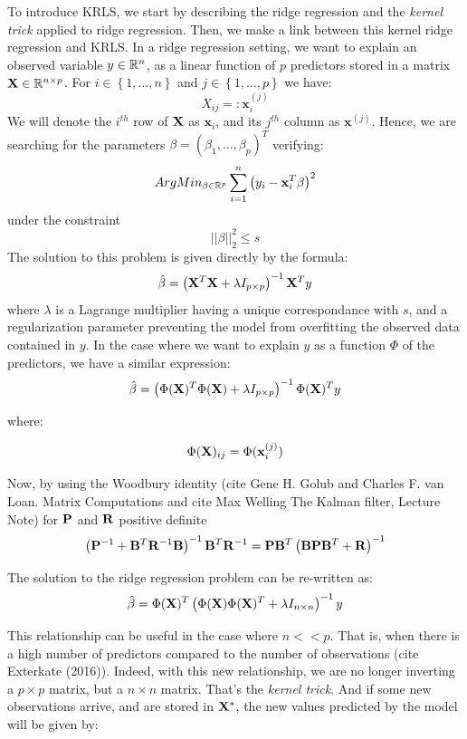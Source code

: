 \medskip

To introduce KRLS, we start by describing the ridge regression \cite{hoerl1970ridge} and the {\it kernel trick} applied to ridge regression. Then, we make a link between this kernel ridge regression and KRLS. In a ridge regression setting, we want to explain an observed variable $y \in \mathbb{R}^n$, as a linear function of $p$ predictors stored in a matrix ${\bf X} \in \mathbb{R}^{n \times p}$. For $i \in \left \lbrace 1, \ldots, n \right \rbrace $ and $j \in \left \lbrace1, \ldots, p \right \rbrace$ we have:
$$
X_{ij} =: \textbf{x}_i^{(j)}
$$
We will denote the $i^{th}$ row of ${\bf X}$ as $\textbf{x}_i$, and its $j^{th}$ column as $\textbf{x}^{(j)}$. Hence, we are searching for the parameters $\beta = \left(\beta_1, \ldots, \beta_p \right)^T$ verifying:
$$
ArgMin_{\beta \in \mathbb{R}^p} \sum_{i = 1}^n \left( y_i - \textbf{x}_i^T {\bf \beta} \right)^2
$$
under the constraint
$$
||\beta ||^2_2 \leq s
$$
The solution to this problem is given directly by the formula:
$$
\hat{\beta} = \left( {\bf X}^T {\bf X} + \lambda I_{p \times p} \right)^{-1}{\bf X}^T y
$$
where $\lambda$ is a Lagrange multiplier having a unique correspondance with $s$, and a regularization parameter preventing the model from overfitting the observed data contained in $y$. In the case where we want to explain $y$ as a function $\Phi$ of the predictors, we have a similar expression:
$$
\hat{\beta} = \left( \Phi({\bf X})^T \Phi({\bf X}) + \lambda I_{p \times p} \right)^{-1}\Phi({\bf X})^T y
$$

where:

$$
\Phi({\bf X})_{ij} = \Phi(\textbf{x}_i^{(j)})
$$

\medskip

Now, by using the Woodbury identity (cite Gene H. Golub and Charles F. van Loan. Matrix Computations and cite Max Welling The Kalman filter, Lecture Note) for ${\bf P}$ and ${\bf R}$ positive definite
$$
\left({\bf P}^{-1} + {\bf B}^T {\bf R}^{-1} {\bf B} \right)^{-1}{\bf B}^T {\bf R}^{-1} =
{\bf P}{\bf B}^T \left( {\bf B} {\bf P} {\bf B}^T + {\bf R}\right)^{-1}
$$

The solution to the ridge regression problem can be re-written as:
$$
\hat{\beta} = \Phi({\bf X})^T \left( \Phi({\bf X})\Phi({\bf X})^T + \lambda I_{n \times n} \right)^{-1} y
$$

This relationship can be useful in the case where $n << p$. That is, when there is a high number of predictors compared to the number of observations (cite Exterkate (2016)). Indeed, with this new relationship, we are no longer inverting a $p \times p$ matrix, but a $n \times n$ matrix. That's the {\it kernel trick}. And if some new observations arrive, and are stored in ${\bf X^*}$, the new values predicted by the model will be given by:

